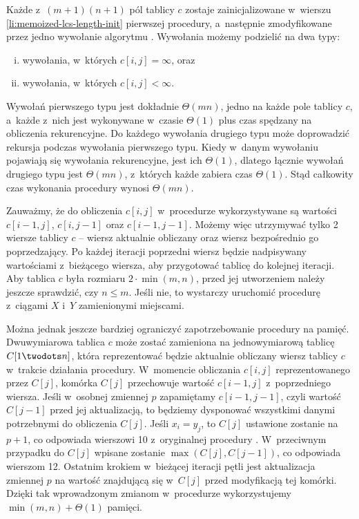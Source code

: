 Każde z~$(m+1)(n+1)$ pól tablicy $c$ zostaje zainicjalizowane w~wierszu \ref{li:memoized-lcs-length-init} pierwszej procedury, a~następnie zmodyfikowane przez jedno wywołanie algorytmu .
Wywołania  możemy podzielić na dwa typy:
\begin{enumerate}[(i)]
	\item wywołania, w~których $c[i,j]=\infty$, oraz
	\item wywołania, w~których $c[i,j]<\infty$.
\end{enumerate}
Wywołań pierwszego typu jest dokładnie $\Theta(mn)$, jedno na każde pole tablicy $c$, a~każde z~nich jest wykonywane w~czasie $\Theta(1)$ plus czas spędzany na obliczenia rekurencyjne.
Do każdego wywołania drugiego typu może doprowadzić rekursja podczas wywołania pierwszego typu.
Kiedy w~danym wywołaniu  pojawiają się wywołania rekurencyjne, jest ich $\Theta(1)$, dlatego łącznie wywołań drugiego typu jest $\Theta(mn)$, z~których każde zabiera czas $\Theta(1)$.
Stąd całkowity czas wykonania procedury  wynosi $\Theta(mn)$.

\exercise %
Zauważmy, że do obliczenia $c[i,j]$ w~procedurze  wykorzystywane są wartości $c[i-1,j]$, $c[i,j-1]$ oraz $c[i-1,j-1]$.
Możemy więc utrzymywać tylko 2 wiersze tablicy $c$ -- wiersz aktualnie obliczany oraz wiersz bezpośrednio go poprzedzający.
Po każdej iteracji poprzedni wiersz będzie nadpisywany wartościami z~bieżącego wiersza, aby przygotować tablicę do kolejnej iteracji.
Aby tablica $c$ była rozmiaru $2\cdot\min(m,n)$, przed jej utworzeniem należy jeszcze sprawdzić, czy $n\le m$.
Jeśli nie, to wystarczy uruchomić procedurę z~ciągami $X$ i~$Y$ zamienionymi miejscami.

Można jednak jeszcze bardziej ograniczyć zapotrzebowanie procedury na pamięć.
Dwuwymiarowa tablica $c$ może zostać zamieniona na jednowymiarową tablicę $C[1\twodots n]$, która reprezentować będzie aktualnie obliczany wiersz tablicy $c$ w~trakcie działania procedury.
W~momencie obliczania $c[i,j]$ reprezentowanego przez $C[j]$, komórka $C[j]$ przechowuje wartość $c[i-1,j]$ z~poprzedniego wiersza.
Jeśli w~osobnej zmiennej $p$ zapamiętamy $c[i-1,j-1]$, czyli wartość $C[j-1]$ przed jej aktualizacją, to będziemy dysponować wszystkimi danymi potrzebnymi do obliczenia $C[j]$.
Jeśli $x_i=y_j$, to $C[j]$ ustawione zostanie na $p+1$, co odpowiada wierszowi 10 z~oryginalnej procedury .
W~przeciwnym przypadku do $C[j]$ wpisane zostanie $\max(C[j],C[j-1])$, co odpowiada wierszom 12.
Ostatnim krokiem w~bieżącej iteracji pętli jest aktualizacja zmiennej $p$ na wartość znajdującą się w~$C[j]$ przed modyfikacją tej komórki.
Dzięki tak wprowadzonym zmianom w~procedurze wykorzystujemy $\min(m,n)+\Theta(1)$ pamięci.

